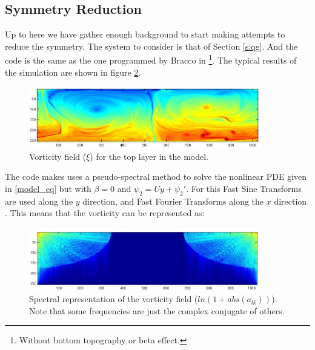 \subsection{Symmetry Reduction}
Up to here we have gather enough background to start making attempts to reduce the symmetry. The system to consider is that of Section \ref{s:qg}. And the code is the same as the one programmed by Bracco in \footnote{Without bottom topography or beta effect.}. The typical results of the simulation are shown in figure \ref{f:fouriervort3}.

    \begin{figure}[t]
    \begin{center}
    \includegraphics[width=0.9\textwidth, clip=true]{Vort_example}
    \end{center}
    \caption{Vorticity field ($\xi$) for the top layer in the model.}
    \label{f:fouriervort2}
    \end{figure}

The code makes uses a pseudo-spectral method to solve the nonlinear PDE given in \ref{model_eq} but with $\beta=0$ and $\psi_2 =  U y + \psi_2'$. For this Fast Sine Transforms are used along the $y$ direction, and Fast Fourier Transforms along the $x$ direction . This means that the vorticity can be represented as:

    \begin{figure}[t]
    \begin{center}
    \includegraphics[width=0.9\textwidth, clip=true]{fourier_example}
    \end{center}
    \caption{Spectral representation of the vorticity field
    ($ln(1+abs(a_{lk}))$). Note that some frequencies are just the complex
    conjugate of others.}
    \label{f:fouriervort3}
    \end{figure}


